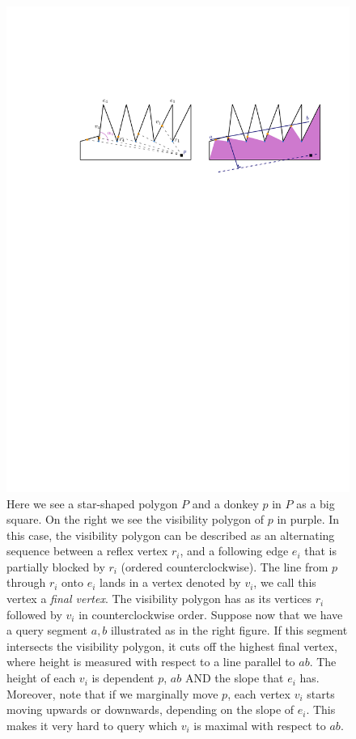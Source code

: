 \documentclass{article}
\begin{document}
\begin{figure}[h]
  \centering
  \includegraphics[]{starproblem}
  \caption{Here we see a star-shaped polygon $P$ and a donkey $p$ in $P$ as a big square. On the right we see the visibility polygon of $p$ in purple. In this case, the visibility polygon can be described as an alternating sequence between a reflex vertex $r_i$, and a following edge $e_i$ that is partially blocked by $r_i$ (ordered counterclockwise). The line from $p$ through $r_i$ onto $e_i$ lands in a vertex denoted by $v_i$, we call this vertex a \emph{final vertex}. The visibility polygon has as its vertices $r_i$ followed by $v_i$ in counterclockwise order. Suppose now that we have a query segment $a,b$ illustrated as in the right figure. If this segment intersects the visibility polygon, it cuts off the highest final vertex, where height is measured with respect to a line parallel to $ab$. The height of each $v_i$ is dependent $p$, $ab$ AND the slope that $e_i$ has. Moreover, note that if we marginally move $p$, each vertex $v_i$ starts moving upwards or downwards, depending on the slope of $e_i$. This makes it very hard to query which $v_i$ is maximal with respect to $ab$.}
    \label{fig:starproblem}
\end{figure}
\end{document}
